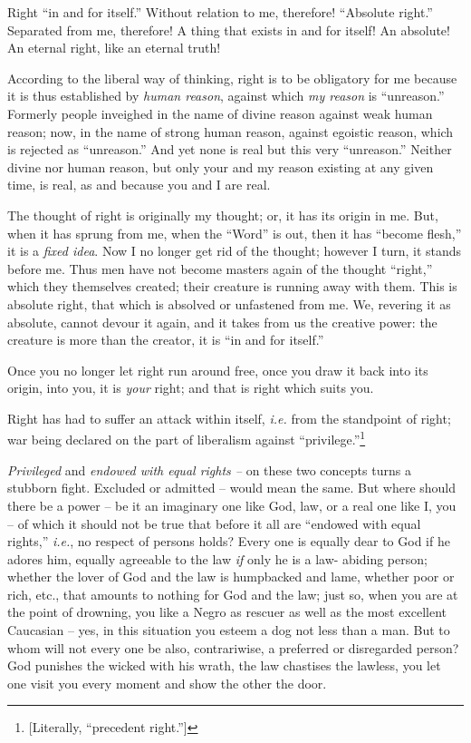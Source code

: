 Right ``in and for itself.'' Without relation to me, therefore! ``Absolute 
right.'' Separated from me, therefore! A thing that exists in and for itself! 
An absolute! An eternal right, like an eternal truth!

According to the liberal way of thinking, right is to be obligatory for me 
because it is thus established by \textit{human reason}, against which 
\textit{my reason} is ``unreason.'' Formerly people inveighed in the name of 
divine reason against weak human reason; now, in the name of strong human 
reason, against egoistic reason, which is rejected as ``unreason.'' And yet 
none is real but this very ``unreason.'' Neither divine nor human reason, 
but only your and my reason existing at any given time, is real, as and 
because you and I are real.

The thought of right is originally my thought; or, it has its origin in me. 
But, when it has sprung from me, when the ``Word'' is out, then it has 
``become flesh,'' it is a \textit{fixed idea}. Now I no longer get rid of 
the thought; however I turn, it stands before me. Thus men have not become 
masters again of the thought ``right,'' which they themselves created; their 
creature is running away with them. This is absolute right, that which is 
absolved or unfastened from me. We, revering it as absolute, cannot devour it 
again, and it takes from us the creative power: the creature is more than the 
creator, it is ``in and for itself.''

Once you no longer let right run around free, once you draw it back into its 
origin, into you, it is \textit{your} right; and that is right which suits 
you.

\myhrule


Right has had to suffer an attack within itself, \textit{i.e.} from the 
standpoint of right; war being declared on the part of liberalism against 
``privilege.''\footnote{[Literally, ``precedent right.'']}

\textit{Privileged} and \textit{endowed with equal rights --} on these two 
concepts turns a stubborn fight. Excluded or admitted -- would mean the same. 
But where should there be a power -- be it an imaginary one like God, law, or 
a real one like I, you -- of which it should not be true that before it all 
are ``endowed with equal rights,'' \textit{i.e.}, no respect of persons 
holds? Every one is equally dear to God if he adores him, equally agreeable to 
the law \textit{if} only he is a law- abiding person; whether the lover of God 
and the law is humpbacked and lame, whether poor or rich, etc., that amounts 
to nothing for God and the law; just so, when you are at the point of 
drowning, you like a Negro as rescuer as well as the most excellent Caucasian  -- yes, in this situation you esteem a dog not less than a man. But to whom 
will not every one be also, contrariwise, a preferred or disregarded person? 
God punishes the wicked with his wrath, the law chastises the lawless, you let 
one visit you every moment and show the other the door.

